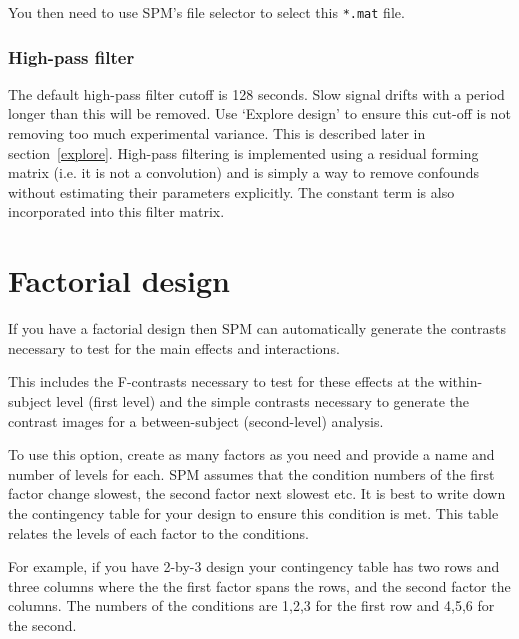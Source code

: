 \documentclass[a4paper,titlepage]{book}
\begin{document}
You then need to use SPM's file selector to select this
\verb!*.mat! file.

\subsubsection{High-pass filter}
The default high-pass filter cutoff is 128 seconds. Slow signal drifts with a period longer than this will be removed. Use `Explore design' to ensure this cut-off is not removing too much experimental variance. 
This is described later in section~\ref{explore}. High-pass filtering is implemented using a residual forming matrix (i.e. it is not a convolution) and is simply a way to remove confounds without estimating their parameters explicitly.  The constant term is also incorporated into this filter matrix.


\section{Factorial design}
If you have a factorial design then SPM can automatically generate the contrasts necessary to test for the main effects and interactions. 

                                                                                                            

This includes the F-contrasts necessary to test for these effects at the within-subject level (first level) and the simple contrasts necessary to generate the contrast images for a between-subject (second-level) analysis.

                                                                                                            

To use this option, create as many factors as you need and provide a name and number of levels for each.  SPM assumes that the condition numbers of the first factor change slowest, the second factor next slowest etc. It is best to write down the contingency table for your design to ensure this condition is met. This table relates the levels of each factor to the conditions. 

                                                                                                            

For example, if you have 2-by-3 design  your contingency table has two rows and three columns where the the first factor spans the rows, and the second factor the columns. The numbers of the conditions are 1,2,3 for the first row and 4,5,6 for the second. 
\end{document}
